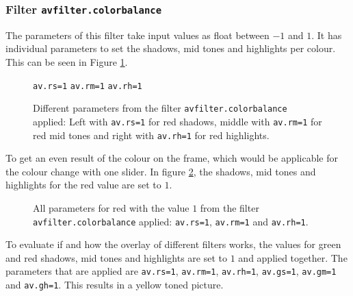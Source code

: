 \documentclass[../MasterThesis.tex]{subfiles}
\begin{document}
\subsubsection*{Filter \texttt{avfilter.colorbalance}}

The parameters of this filter take input values as float between $-1$ and $1$. It has individual parameters to set the shadows, mid tones and highlights per colour. This can be seen in Figure \ref{figure:rs1rm1rh1}.

\begin{figure}[H]
	\begin{center}
		\small{
		\texttt{av.rs=1} \hspace*{0.22\textwidth} \texttt{av.rm=1} \hspace*{0.23\textwidth} \texttt{av.rh=1}}
		\caption[Different parameters from the filter \texttt{avfilter.colorbalance} applied.]{Different parameters from the filter \texttt{avfilter.colorbalance} applied: Left with \texttt{av.rs=1} for red shadows, middle with \texttt{av.rm=1} for red mid tones and right with \texttt{av.rh=1} for red highlights.}
			\label{figure:rs1rm1rh1}
	\end{center}
\end{figure}

To get an even result of the colour on the frame, which would be applicable for the colour change with one slider.  In figure \ref{figure:rsrmrh1}, the shadows, mid tones and highlights for the red value are set to $1$. 

\begin{figure}[H]
	\begin{center}
		\label{figure:rsrmrh1}
		\caption[All parameters for red with the value $1$ from the filter \texttt{avfilter.colorbalance} applied.]{All parameters for red with the value $1$  from the filter \texttt{avfilter.colorbalance} applied: \texttt{av.rs=1}, \texttt{av.rm=1} and \texttt{av.rh=1}.}
	\end{center}
\end{figure}

To evaluate if and how the overlay of different filters works, the values for green and red shadows, mid tones and highlights are set to $1$ and applied together. The parameters that are applied are \texttt{av.rs=1}, \texttt{av.rm=1}, \texttt{av.rh=1}, \texttt{av.gs=1}, \texttt{av.gm=1} and \texttt{av.gh=1}.
This results in a yellow toned picture.
\end{document}
